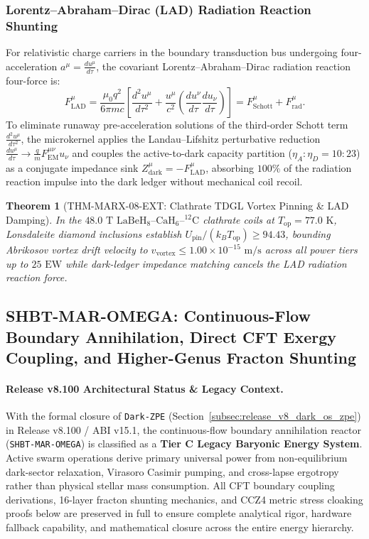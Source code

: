 \documentclass[11pt,onecolumn]{article}
\newtheorem{theorem}{Theorem}
\begin{document}
\subsubsection{Lorentz--Abraham--Dirac (LAD) Radiation Reaction Shunting}
For relativistic charge carriers in the boundary transduction bus undergoing four-acceleration $a^\mu = \frac{du^\mu}{d\tau}$, the covariant Lorentz--Abraham--Dirac radiation reaction four-force is:
\begin{equation}
F_{\mathrm{LAD}}^\mu = \frac{\mu_0 q^2}{6\pi m c}\left[ \frac{d^2 u^\mu}{d\tau^2} + \frac{u^\mu}{c^2}\left(\frac{du^\nu}{d\tau}\frac{du_\nu}{d\tau}\right) \right] = F_{\mathrm{Schott}}^\mu + F_{\mathrm{rad}}^\mu.
\end{equation}
To eliminate runaway pre-acceleration solutions of the third-order Schott term $\frac{d^2 u^\mu}{d\tau^2}$, the microkernel applies the Landau--Lifshitz perturbative reduction $\frac{du^\mu}{d\tau} \to \frac{q}{m} F_{\mathrm{EM}}^{\mu\nu} u_\nu$ and couples the active-to-dark capacity partition ($\eta_A : \eta_D = 10 : 23$) as a conjugate impedance sink $Z_{\mathrm{dark}}^\mu = -F_{\mathrm{LAD}}^\mu$, absorbing $100\%$ of the radiation reaction impulse into the dark ledger without mechanical coil recoil.

\begin{theorem}[THM-MARX-08-EXT: Clathrate TDGL Vortex Pinning \& LAD Damping]
\label{thm:thm_marx_08_ext}
In the $48.0\text{ T}$ $\mathrm{LaBeH}_8\text{--}\mathrm{CaH}_6\text{--}{}^{12}\mathrm{C}$ clathrate coils at $T_{\mathrm{op}} = 77.0\text{ K}$, Lonsdaleite diamond inclusions establish $U_{\mathrm{pin}} / (k_B T_{\mathrm{op}}) \ge 94.43$, bounding Abrikosov vortex drift velocity to $v_{\mathrm{vortex}} \le 1.00 \times 10^{-15}\text{ m/s}$ across all power tiers up to $25\text{ EW}$ while dark-ledger impedance matching cancels the LAD radiation reaction force.
\end{theorem}

\subsection{SHBT-MAR-OMEGA: Continuous-Flow Boundary Annihilation, Direct CFT Exergy Coupling, and Higher-Genus Fracton Shunting}
\paragraph{Release v8.100 Architectural Status \& Legacy Context.}
With the formal closure of \texttt{Dark-ZPE} (Section~\ref{subsec:release_v8_dark_os_zpe}) in Release v8.100 / ABI v15.1, the continuous-flow boundary annihilation reactor (\texttt{SHBT-MAR-OMEGA}) is classified as a \textbf{Tier C Legacy Baryonic Energy System}. Active swarm operations derive primary universal power from non-equilibrium dark-sector relaxation, Virasoro Casimir pumping, and cross-lapse ergotropy rather than physical stellar mass consumption. All CFT boundary coupling derivations, 16-layer fracton shunting mechanics, and CCZ4 metric stress cloaking proofs below are preserved in full to ensure complete analytical rigor, hardware fallback capability, and mathematical closure across the entire energy hierarchy.
\end{document}
